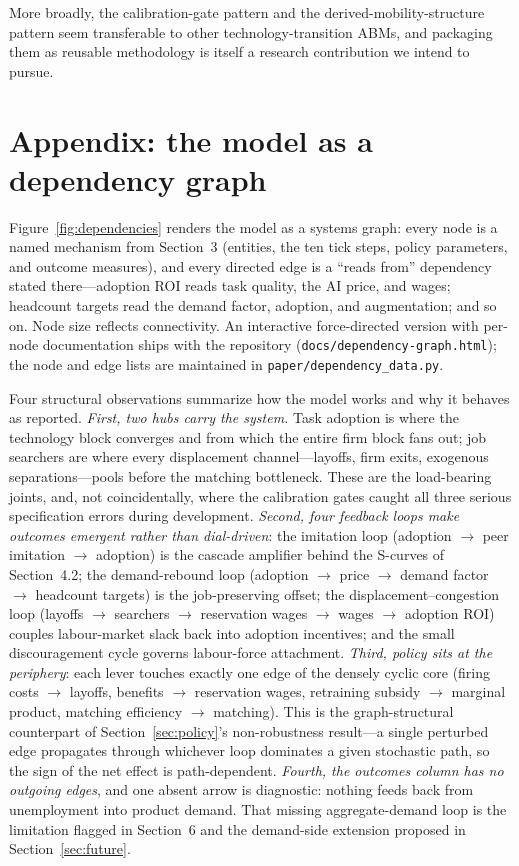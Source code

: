\documentclass[11pt,a4paper]{article}
\begin{document}
More broadly, the calibration-gate pattern and the derived-mobility-structure pattern
seem transferable to other technology-transition ABMs, and packaging them as reusable
methodology is itself a research contribution we intend to pursue.

{\small


}

\appendix

\section{Appendix: the model as a dependency graph}
\label{app:dependencies}

Figure~\ref{fig:dependencies} renders the model as a systems graph: every node is a
named mechanism from Section~3 (entities, the ten tick steps, policy parameters, and
outcome measures), and every directed edge is a ``reads from'' dependency stated
there---adoption ROI reads task quality, the AI price, and wages; headcount targets read
the demand factor, adoption, and augmentation; and so on. Node size reflects
connectivity. An interactive force-directed version with per-node documentation ships
with the repository (\texttt{docs/dependency-graph.html}); the node and edge lists are
maintained in \texttt{paper/dependency\_data.py}.

Four structural observations summarize how the model works and why it behaves as
reported. \emph{First, two hubs carry the system.} Task adoption is where the
technology block converges and from which the entire firm block fans out; job searchers
are where every displacement channel---layoffs, firm exits, exogenous
separations---pools before the matching bottleneck. These are the load-bearing joints,
and, not coincidentally, where the calibration gates caught all three serious
specification errors during development. \emph{Second, four feedback loops make
outcomes emergent rather than dial-driven}: the imitation loop (adoption
$\to$ peer imitation $\to$ adoption) is the cascade amplifier behind the S-curves of
Section~4.2; the demand-rebound loop (adoption $\to$ price $\to$ demand factor $\to$
headcount targets) is the job-preserving offset; the displacement--congestion loop
(layoffs $\to$ searchers $\to$ reservation wages $\to$ wages $\to$ adoption ROI) couples
labour-market slack back into adoption incentives; and the small discouragement cycle
governs labour-force attachment. \emph{Third, policy sits at the periphery}: each lever
touches exactly one edge of the densely cyclic core (firing costs $\to$ layoffs,
benefits $\to$ reservation wages, retraining subsidy $\to$ marginal product, matching
efficiency $\to$ matching). This is the graph-structural counterpart of
Section~\ref{sec:policy}'s non-robustness result---a single perturbed edge propagates
through whichever loop dominates a given stochastic path, so the sign of the net effect
is path-dependent. \emph{Fourth, the outcomes column has no outgoing edges}, and one
absent arrow is diagnostic: nothing feeds back from unemployment into product demand.
That missing aggregate-demand loop is the limitation flagged in Section~6 and the
demand-side extension proposed in Section~\ref{sec:future}.
\end{document}
